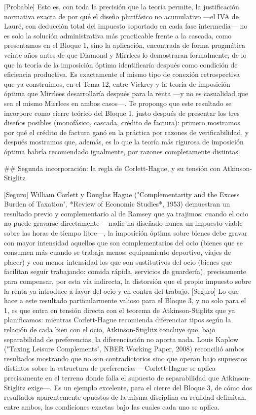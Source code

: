 \documentclass[10pt,a4paper]{article}
\begin{document}
[Probable] Esto es, con toda la precisión que la teoría permite, la justificación normativa exacta de por qué el diseño plurifásico no acumulativo —el IVA de Lauré, con deducción total del impuesto soportado en cada fase intermedia— no es solo la solución administrativa más practicable frente a la cascada, como presentamos en el Bloque 1, sino la aplicación, encontrada de forma pragmática veinte años antes de que Diamond y Mirrlees lo demostraran formalmente, de lo que la teoría de la imposición óptima identificaría después como condición de eficiencia productiva. Es exactamente el mismo tipo de conexión retrospectiva que ya construimos, en el Tema 12, entre Vickrey y la teoría de imposición óptima que Mirrlees desarrollaría después para la renta —y no es casualidad que sea el mismo Mirrlees en ambos casos—. Te propongo que este resultado se incorpore como cierre teórico del Bloque 1, justo después de presentar los tres diseños posibles (monofásico, cascada, crédito de factura): primero mostramos por qué el crédito de factura ganó en la práctica por razones de verificabilidad, y después mostramos que, además, es lo que la teoría más rigurosa de imposición óptima habría recomendado igualmente, por razones completamente distintas.

## Segunda incorporación: la regla de Corlett-Hague, y su tensión con Atkinson-Stiglitz

[Seguro] William Corlett y Douglas Hague ("Complementarity and the Excess Burden of Taxation", *Review of Economic Studies*, 1953) demuestran un resultado previo y complementario al de Ramsey que ya trajimos: cuando el ocio no puede gravarse directamente —nadie ha diseñado nunca un impuesto viable sobre las horas de tiempo libre—, la imposición óptima sobre bienes debe gravar con mayor intensidad aquellos que son complementarios del ocio (bienes que se consumen más cuando se trabaja menos: equipamiento deportivo, viajes de placer) y con menor intensidad los que son sustitutivos del ocio (bienes que facilitan seguir trabajando: comida rápida, servicios de guardería), precisamente para compensar, por esta vía indirecta, la distorsión que el propio impuesto sobre la renta ya introduce a favor del ocio y en contra del trabajo. [Seguro] Lo que hace a este resultado particularmente valioso para el Bloque 3, y no solo para el 1, es que entra en tensión directa con el teorema de Atkinson-Stiglitz que ya planificamos: mientras Corlett-Hague recomienda diferenciar tipos según la relación de cada bien con el ocio, Atkinson-Stiglitz concluye que, bajo separabilidad de preferencias, la diferenciación no aporta nada. Louis Kaplow ("Taxing Leisure Complements", NBER Working Paper, 2008) reconcilió ambos resultados mostrando que no son contradictorios sino que operan bajo supuestos distintos sobre la estructura de preferencias —Corlett-Hague se aplica precisamente en el terreno donde falla el supuesto de separabilidad que Atkinson-Stiglitz exige—. Es un ejemplo excelente, para el cierre del Bloque 3, de cómo dos resultados aparentemente opuestos de la misma disciplina en realidad delimitan, entre ambos, las condiciones exactas bajo las cuales cada uno se aplica.
\end{document}

